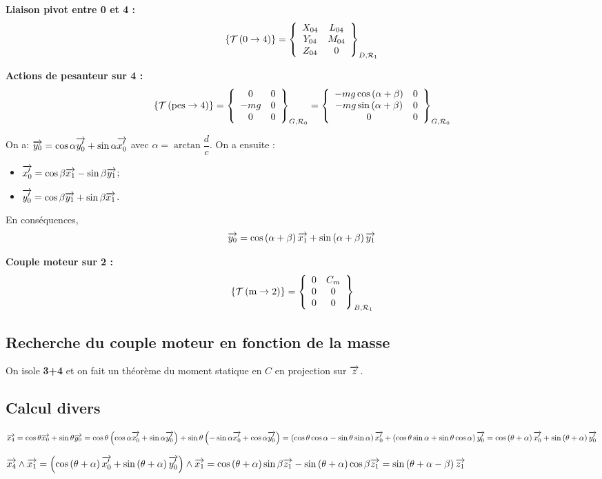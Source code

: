 \documentclass[10pt,fleqn]{article} %
\begin{document}
\textbf{Liaison pivot entre 0 et 4 :}
$$
\torseurstat{T}{0}{4}=\torseurcol{X_{04}}{Y_{04}}{Z_{04}}{L_{04}}{M_{04}}{0}{D,\mathcal{R}_1}
$$

\textbf{Actions de pesanteur sur 4 :}
$$
\torseurstat{T}{\text{pes}}{4}=\torseurcol{0}{-mg}{0}{0}{0}{0}{G,\mathcal{R}_0}
=\torseurcol{-mg\cos\left(\alpha + \beta \right)}{-mg\sin\left(\alpha + \beta \right)}{0}{0}{0}{0}{G,\mathcal{R}_0}
$$

On a: $\vect{y_0} = \cos\alpha \vect{y_0'} +\sin \alpha \vect{x_0'} $ avec $\alpha=\arctan \dfrac{d}{c}$. On a ensuite : 
\begin{itemize}
\item  $\vect{x_0'}= \cos\beta \vect{x_1} -\sin \beta \vect{y_1}$;
\item  $\vect{y_0'}= \cos\beta \vect{y_1} +\sin \beta \vect{x_1}$.
\end{itemize}

En conséquences, 
$$
\vect{y_0} =\cos\left( \alpha + \beta \right) \vect{x_1}+\sin\left( \alpha + \beta \right) \vect{y_1}
$$


\textbf{Couple moteur sur 2 :}
$$
\torseurstat{T}{\text{m}}{2}=\torseurcol{0}{0}{0}{C_m}{0}{0}{B,\mathcal{R}_1}
$$

\subsection{Recherche du couple moteur en fonction de la masse}

On isole \textbf{3+4} et on fait un théorème du moment statique en $C$ en projection sur $\vect{z}$.


\subsection{Calcul divers}

$\vect{x_4}  
= \cos \theta \vect{x_0} + \sin \theta \vect{y_0} 
= \cos \theta \left( \cos \alpha \vect{x_0'} + \sin \alpha \vect{y_0'} \right) + \sin \theta \left(
-\sin \alpha \vect{x_0'} + \cos \alpha \vect{y_0'} 
 \right)
 = \left(\cos \theta \cos \alpha -\sin \theta \sin \alpha \right)\vect{x_0'} + \left(\cos \theta \sin \alpha  + \sin \theta \cos \alpha \right)\vect{y_0'} 
  = \cos \left(\theta + \alpha \right)\vect{x_0'} + \sin \left(\theta + \alpha \right)\vect{y_0'} 
$



$\vect{x_4} \wedge \vect{x_1} 
= \left( \cos \left(\theta + \alpha \right)\vect{x_0'} + \sin \left(\theta + \alpha \right)\vect{y_0'} \right)\wedge \vect{x_1}
= \cos \left(\theta + \alpha \right)\sin\beta  \vect{z_1} - \sin \left(\theta + \alpha \right)\cos\beta \vect{z_1}
= \sin \left(\theta + \alpha -\beta\right) \vect{z_1} $
\end{document}

